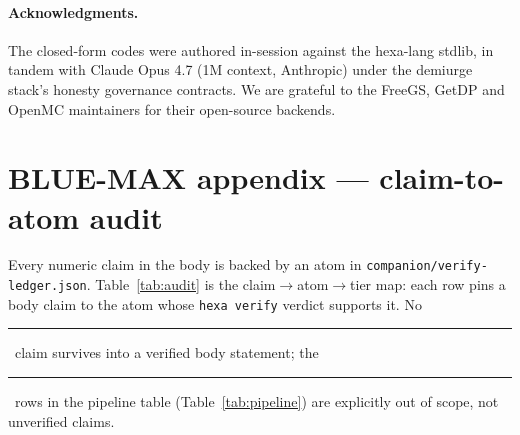 \documentclass[11pt,a4paper]{article}
\newcommand{\tierdisc}[1]{\textcolor{#1}{\rule[0.05ex]{1.0ex}{1.0ex}}}
\newcommand{\tierOrange}{\tierdisc{orange!90!black}}
\begin{document}
\paragraph{Acknowledgments.} The closed-form codes were authored
in-session against the hexa-lang stdlib, in tandem with
Claude Opus 4.7 (1M context, Anthropic) under the demiurge stack's
honesty governance contracts. We are grateful to the FreeGS, GetDP
and OpenMC maintainers for their open-source backends.




\clearpage
\appendix














\section{BLUE-MAX appendix --- claim-to-atom audit}
\label{app:blue-max}

Every numeric claim in the body is backed by an atom in
\texttt{companion/verify-ledger.json}. Table~\ref{tab:audit} is the
claim$\to$atom$\to$tier map: each row pins a body claim to the atom
whose \texttt{hexa verify} verdict supports it. No \tierOrange\ claim
survives into a verified body statement; the \tierOrange\ rows in the
pipeline table (Table~\ref{tab:pipeline}) are explicitly out of scope,
not unverified claims.
\end{document}
